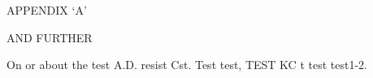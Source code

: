 \documentclass[11pt,a4paper]{article}
\begin{document}
APPENDIX ‘A’

AND FURTHER

On or about the test A.D.  resist Cst. Test  test, TEST KC t test test1-2.
\end{document}
